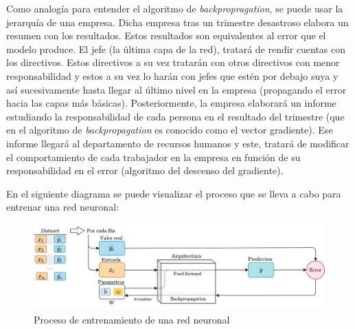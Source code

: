 \label{p:company_backpropagation}
Como analogía para entender el algoritmo de \textit{backpropragation}, se puede usar la jerarquía de una empresa. Dicha empresa tras un trimestre desastroso elabora un resumen con los resultados. Estos resultados son equivalentes al error que el modelo produce. El jefe (la última capa de la red), tratará de rendir cuentas con los directivos. Estos directivos a su vez tratarán con otros directivos con menor responsabilidad y estos a su vez lo harán con jefes que estén por debajo suya y así sucesivamente hasta llegar al último nivel en la empresa (propagando el error hacia las capas más básicas). Posteriormente, la empresa elaborará un informe estudiando la responsabilidad de cada persona en el resultado del trimestre (que en el algoritmo de \textit{backpropagation} es conocido como el vector gradiente). Ese informe llegará al departamento de recursos humanos y este, tratará de modificar el comportamiento de cada trabajador en la empresa en función de su responsabilidad en el error (algoritmo del descenso del gradiente).
\newline

En el siguiente diagrama se puede visualizar el proceso que se lleva a cabo para entrenar una red neuronal: 
\begin{figure}[H]
    \centering
    \includegraphics[width=15cm]{images/state-of-art/training/training.png}
    \caption{Proceso de entrenamiento de una red neuronal}
    \label{fig:error_regression}
\end{figure}
